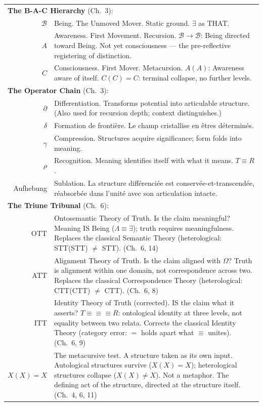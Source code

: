 \documentclass[10pt, openany, oneside]{book}
\renewcommand{\footnotesize}{\fontsize{8.5}{11}\selectfont}
\begin{document}
{\footnotesize
\noindent\begin{tabular}{@{} r @{\hspace{0.6em}} p{} @{}}
\multicolumn{2}{l}{\textbf{The B-A-C Hierarchy} (Ch.\ 3):} \\[0.3em]
$\mathcal{B}$ & Being. The Unmoved Mover. Static ground. $\exists$ as THAT. \\[0.3em]
$A$ & Awareness. First Movement. Recursion. $\mathcal{B} \to \mathcal{B}$: Being directed toward Being. Not yet consciousness --- the pre-reflective registering of distinction. \\[0.3em]
$C$ & Consciousness. First Mover. Metacursion. $A(A)$: Awareness aware of itself. $C(C) = C$: terminal collapse, no further levels. \\[0.3em]
\multicolumn{2}{l}{\textbf{The Operator Chain} (Ch.\ 3):} \\[0.3em]
$\partial$ & Differentiation. Transforms potential into articulable structure. (Also used for recursion depth; context distinguishes.) \\[0.3em]
$\delta$ & Formation de frontière. Le champ cristallise en êtres déterminés. \\[0.3em]
$\gamma$ & Compression. Structures acquire significance; form folds into meaning. \\[0.3em]
$\rho$ & Recognition. Meaning identifies itself with what it means. $T \equiv R$. \\[0.3em]
Aufhebung & Sublation. La structure différenciée est conservée-et-transcendée, réabsorbée dans l'unité avec son articulation intacte. \\[0.3em]
\multicolumn{2}{l}{\textbf{The Triune Tribunal} (Ch.\ 6):} \\[0.3em]
OTT & Ontosemantic Theory of Truth. Is the claim meaningful? Meaning IS Being ($\Lambda \equiv \exists$); truth requires meaningfulness. Replaces the classical Semantic Theory (heterological: STT(STT) $\neq$ STT). (Ch.\ 6, 14) \\[0.3em]
ATT & Alignment Theory of Truth. Is the claim aligned with $\Omega$? Truth is alignment within one domain, not correspondence across two. Replaces the classical Correspondence Theory (heterological: CTT(CTT) $\neq$ CTT). (Ch.\ 6, 8) \\[0.3em]
ITT & Identity Theory of Truth (corrected). IS the claim what it asserts? $T \equiv\!\equiv\!\equiv R$: ontological identity at three levels, not equality between two relata. Corrects the classical Identity Theory (category error: $=$ holds apart what $\equiv$ unites). (Ch.\ 6, 9) \\[0.3em]
$X(X) = X$ & The metacursive test. A structure taken as its own input. Autological structures survive ($X(X) = X$); heterological structures collapse ($X(X) \neq X$). Not a metaphor. The defining act of the structure, directed at the structure itself. (Ch.\ 4, 6, 11) \\[0.3em]
\end{tabular}
}
\end{document}
